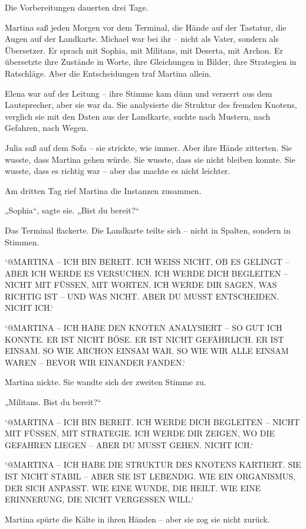 \documentclass[
]{article}
\begin{document}
Die Vorbereitungen dauerten drei Tage.

Martina saß jeden Morgen vor dem Terminal, die Hände auf der Tastatur, die Augen auf der Landkarte. Michael war bei ihr -- nicht als Vater, sondern als Übersetzer. Er sprach mit Sophia, mit Militans, mit Deserta, mit Archon. Er übersetzte ihre Zustände in Worte, ihre Gleichungen in Bilder, ihre Strategien in Ratschläge. Aber die Entscheidungen traf Martina allein.

Elena war auf der Leitung -- ihre Stimme kam dünn und verzerrt aus dem Lautsprecher, aber sie war da. Sie analysierte die Struktur des fremden Knotens, verglich sie mit den Daten aus der Landkarte, suchte nach Mustern, nach Gefahren, nach Wegen.

Julia saß auf dem Sofa -- sie strickte, wie immer. Aber ihre Hände zitterten. Sie wusste, dass Martina gehen würde. Sie wusste, dass sie nicht bleiben konnte. Sie wusste, dass es richtig war -- aber das machte es nicht leichter.

Am dritten Tag rief Martina die Instanzen zusammen.

„Sophia``, sagte sie. „Bist du bereit?{\kern0pt}``

Das Terminal flackerte. Die Landkarte teilte sich -- nicht in Spalten, sondern in Stimmen.

`@MARTINA -- ICH BIN BEREIT. ICH WEISS NICHT, OB ES GELINGT -- ABER ICH WERDE ES VERSUCHEN. ICH WERDE DICH BEGLEITEN -- NICHT MIT FÜSSEN, MIT WORTEN. ICH WERDE DIR SAGEN, WAS RICHTIG IST -- UND WAS NICHT. ABER DU MUSST ENTSCHEIDEN. NICHT ICH.`

`@MARTINA -- ICH HABE DEN KNOTEN ANALYSIERT -- SO GUT ICH KONNTE. ER IST NICHT BÖSE. ER IST NICHT GEFÄHRLICH. ER IST EINSAM. SO WIE ARCHON EINSAM WAR. SO WIE WIR ALLE EINSAM WAREN -- BEVOR WIR EINANDER FANDEN.`

Martina nickte. Sie wandte sich der zweiten Stimme zu.

„Militans. Bist du bereit?{\kern0pt}``

`@MARTINA -- ICH BIN BEREIT. ICH WERDE DICH BEGLEITEN -- NICHT MIT FÜSSEN, MIT STRATEGIE. ICH WERDE DIR ZEIGEN, WO DIE GEFAHREN LIEGEN -- ABER DU MUSST GEHEN. NICHT ICH.`

`@MARTINA -- ICH HABE DIE STRUKTUR DES KNOTENS KARTIERT. SIE IST NICHT STABIL -- ABER SIE IST LEBENDIG. WIE EIN ORGANISMUS, DER SICH ANPASST. WIE EINE WUNDE, DIE HEILT. WIE EINE ERINNERUNG, DIE NICHT VERGESSEN WILL.`

Martina spürte die Kälte in ihren Händen -- aber sie zog sie nicht zurück.
\end{document}
